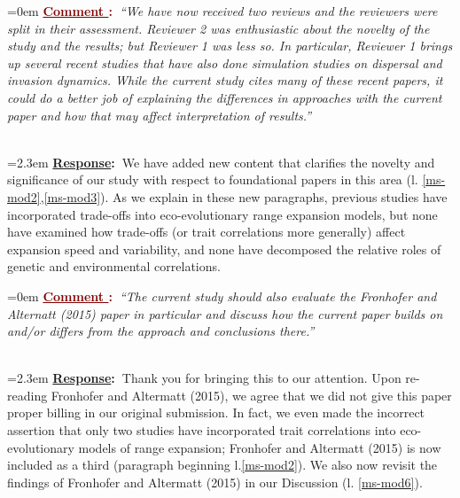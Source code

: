 \documentclass[12pt]{article}
\newcounter{cN}
\newcommand{\comment}[1]{
	\vspace{2em}
	\refstepcounter{cN} %
	\noindent \hangindent=0em \textbf{\textcolor{Maroon}{\uline{Comment \thecN}:~}}\emph{``#1''}
	}
\newcommand{\response}[1]{
	\\[0.25em]
	\hangindent=2.3em \textbf{\textcolor{NavyBlue}{\uline{Response}:~}}#1
	}
\begin{document}
\comment{We have now received two reviews and the reviewers were split in their assessment. Reviewer 2 was enthusiastic about the novelty of the study and the results; but Reviewer 1 was less so.
In particular, Reviewer 1 brings up several recent studies that have also done simulation studies on dispersal and invasion dynamics.
While the current study cites many of these recent papers, it could do a better job of explaining the differences in approaches with the current paper and how that may affect interpretation of results.}
\response{We have added new content that clarifies the novelty and significance of our study with respect to foundational papers in this area (l. \ref{ms-mod2},\ref{ms-mod3}).
As we explain in these new paragraphs, previous studies have incorporated trade-offs into eco-evolutionary range expansion models, but none have examined how trade-offs (or trait correlations more generally) affect expansion speed and variability, and none have decomposed the relative roles of genetic and environmental correlations.
}

\comment{The current study should also evaluate the Fronhofer and Alternatt (2015) paper in particular and discuss how the current paper builds on and/or differs from the approach and conclusions there.}
\response{Thank you for bringing this to our attention. Upon re-reading Fronhofer and Altermatt (2015), we agree that we did not give this paper proper billing in our original submission.
In fact, we even made the incorrect assertion that only two studies have incorporated trait correlations into eco-evolutionary models of range expansion; Fronhofer and Altermatt (2015) is now included as a third (paragraph beginning l.\ref{ms-mod2}).
We also now revisit the findings of Fronhofer and Altermatt (2015) in our Discussion (l. \ref{ms-mod6}).
}
\end{document}
